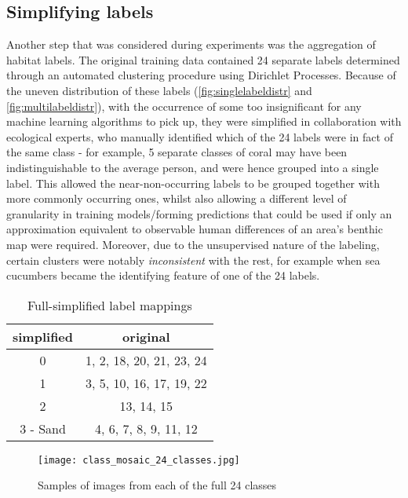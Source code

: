 \subsection{Simplifying labels}
Another step that was considered during experiments was the aggregation of habitat labels. The original training data contained 24 separate labels determined through an automated clustering procedure using Dirichlet Processes. Because of the uneven distribution of these labels (\autoref{fig:singlelabeldistr} and \autoref{fig:multilabeldistr}), with the occurrence of some too insignificant for any machine learning algorithms to pick up, they were simplified in collaboration with ecological experts, who manually identified which of the 24 labels were in fact of the same class - for example, 5 separate classes of coral may have been indistinguishable to the average person, and were hence grouped into a single label. This allowed the near-non-occurring labels to be grouped together with more commonly occurring ones, whilst also allowing a different level of granularity in training models/forming predictions that could be used if only an approximation equivalent to observable human differences of an area's benthic map were required. Moreover, due to the unsupervised nature of the labeling, certain clusters were notably \textit{inconsistent} with the rest, for example when sea cucumbers became the identifying feature of one of the 24 labels.

\begin{table}[H]
    \centering
    \begin{tabular}{|c| c|}
        \hline
        simplified & original \\\hline
        0 & 1, 2, 18, 20, 21, 23, 24 \\
        1 & 3, 5, 10, 16, 17, 19, 22\\
        2 & 13, 14, 15 \\
        3 - Sand & 4, 6, 7, 8, 9, 11, 12 \\
        \hline
    \end{tabular}
    \caption{Full-simplified label mappings \tiny{}}
    \label{table:labelmappings}
\end{table}

\begin{figure}
    \texttt{[image: class\_mosaic\_24\_classes.jpg]}
    \caption{Samples of images from each of the full 24 classes}
    \label{fig:24classes}
\end{figure}


